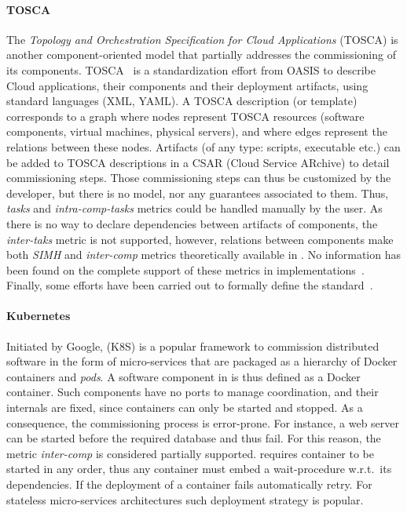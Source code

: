 \paragraph{TOSCA}
The \emph{Topology and Orchestration Specification for Cloud Applications} (TOSCA) is another component-oriented model that partially addresses the commissioning of its components. TOSCA~\cite{tosca:web,brogi2018} is a standardization effort from OASIS to describe Cloud applications, their components and their deployment artifacts, using standard languages (\ie XML, YAML). A TOSCA description (or template) corresponds to a graph where nodes represent TOSCA resources (\eg software components, virtual machines, physical servers), and where edges represent the relations between these nodes. Artifacts (of any type: scripts, executable etc.) can be added to TOSCA descriptions in a CSAR (Cloud Service ARchive) to detail commissioning steps. Those commissioning steps can thus be customized by the developer, but there is no model, nor any guarantees associated to them. Thus, \emph{tasks} and \emph{intra-comp-tasks} metrics could be handled manually by the user. As there is no way to declare dependencies between artifacts of components, the \emph{inter-taks} metric is not supported, however, relations between components make both \emph{SIMH} and \emph{inter-comp} metrics theoretically available in \tosca. No information has been found on the complete support of these metrics in \tosca implementations~\cite{cloudify:web,opentosca:web}. Finally, some efforts have been carried out to formally define the \tosca standard~\cite{7561358}.

\paragraph{Kubernetes}
Initiated by Google, \kubernetes (K8S) is a popular framework to commission distributed software in the form of micro-services that are packaged as a hierarchy of Docker containers and \emph{pods}. A software component in \kubernetes is thus defined as a Docker container. Such components have no ports to manage coordination, and their internals are fixed, since containers can only be started and stopped. As a consequence, the commissioning process is error-prone. For instance, a web server can be started before the required database and thus fail. For this reason, the metric \emph{inter-comp} is considered partially supported. \kubernetes requires container to be started in any order, thus any container must embed a wait-procedure w.r.t.\ its dependencies. If the deployment of a container fails \kubernetes automatically retry. For stateless micro-services architectures such deployment strategy is popular.

